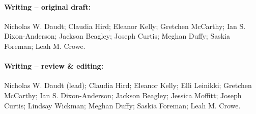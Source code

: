 \documentclass[10pt,letterpaper]{article}
\begin{document}
\paragraph*{Writing – original draft:}  Nicholas W. Daudt; Claudia Hird; Eleanor Kelly; Gretchen McCarthy; Ian S. Dixon-Anderson; Jackson Beagley; Joseph Curtis; Meghan Duffy; Saskia Foreman; Leah M. Crowe.

\paragraph*{Writing – review & editing:}  Nicholas W. Daudt (lead); Claudia Hird; Eleanor Kelly; Elli Leinikki; Gretchen McCarthy; Ian S. Dixon-Anderson; Jackson Beagley; Jessica Moffitt; Joseph Curtis; Lindsay Wickman; Meghan Duffy; Saskia Foreman; Leah M. Crowe.

\nolinenumbers

%
%
% 






\end{document}
